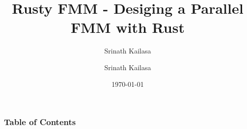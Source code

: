 \documentclass{beamer}
\title{Rusty FMM - Desiging a Parallel FMM with Rust}
\author{Srinath Kailasa}
\author[shortname]{Srinath Kailasa}
\institute[shortinst]{Department of Mathematics, University College London}
\date{\today}
\begin{document}
\frame{\titlepage}

\begin{frame}
\frametitle{Table of Contents}
\tableofcontents
\end{frame}


% 
% 

% 
\end{document}
